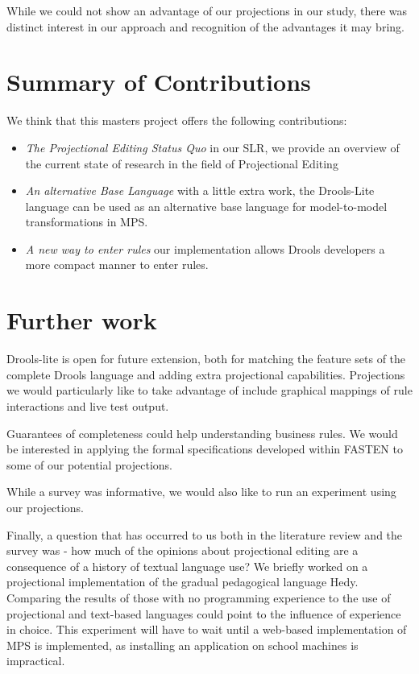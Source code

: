 While we could not show an advantage of our projections in our study, there was distinct interest in our approach and recognition of the advantages it may bring.

\section{Summary of Contributions}

We think that this masters project offers the following contributions:
\begin{itemize}
    \item \emph{The Projectional Editing Status Quo} in our SLR, we provide an overview of the current state of research in the field of Projectional Editing
    \item \emph{An alternative Base Language} with a little extra work, the Drools-Lite language can be used as an alternative base language for model-to-model transformations in MPS.
    \item \emph{A new way to enter rules} our implementation allows Drools developers a more compact manner to enter rules.
\end{itemize}

\section{Further work}

Drools-lite is open for future extension, both for matching the feature sets of the complete Drools language and adding extra projectional capabilities.
Projections we would particularly like to take advantage of include graphical mappings of rule interactions and live test output.

Guarantees of completeness could help understanding business rules.
We would be interested in applying the formal specifications developed within FASTEN\cite{ratiu2019fasten} to some of our potential projections.

While a survey was informative, we would also like to run an experiment using our projections.

Finally, a question that has occurred to us both in the literature review and the survey was - how much of the opinions about projectional editing are a consequence of a history of textual language use?
We briefly worked on a projectional implementation of the gradual pedagogical language Hedy\cite{hermans2020hedy}.
Comparing the results of those with no programming experience to the use of projectional and text-based languages could point to the influence of experience in choice.
This experiment will have to wait until a web-based implementation of MPS is implemented, as installing an application on school machines is impractical.
